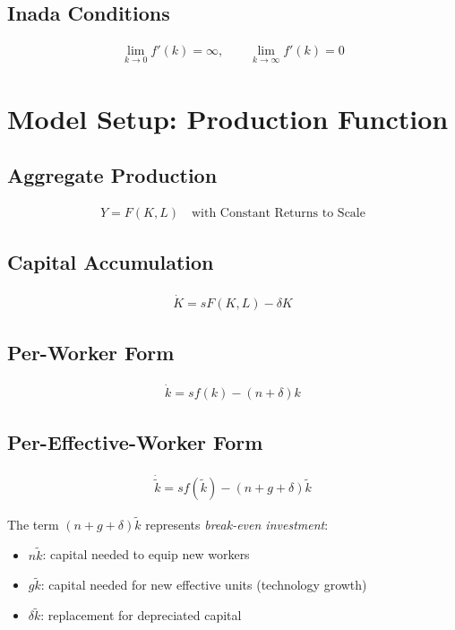 \documentclass[a4paper,11pt]{article}
\newcommand{\ktilde}{\tilde{k}}
\begin{document}
\medskip
\subsection*{Inada Conditions}
\begin{align*}
\lim_{k \to 0} f'(k) = \infty, \qquad \lim_{k \to \infty} f'(k) = 0
\tag{Inada}
\end{align*}

\clearpage

\section{Model Setup: Production Function}

\subsection*{Aggregate Production}
\begin{align*}
Y = F(K, L) \quad \text{with Constant Returns to Scale}
\tag{Production}
\end{align*}

\subsection*{Capital Accumulation}
\begin{align*}
\dot{K} = sF(K, L) - \delta K
\tag{Capital Accumulation}
\end{align*}

\subsection*{Per-Worker Form}
\begin{align*}
\dot{k} = sf(k) - (n + \delta)k
\tag{Per-Worker Dynamics}
\end{align*}

\subsection*{Per-Effective-Worker Form}
\begin{align*}
\dot{\ktilde} = s f(\ktilde) - (n + g + \delta)\ktilde
\tag{Per-Effective Dynamics}
\end{align*}

\medskip
\begin{tcolorbox}[colback=yellow!10,colframe=yellow!60,title=Break-Even Investment]
The term $(n+g+\delta)\ktilde$ represents \textit{break-even investment}:
\begin{itemize}
    \item $n\ktilde$: capital needed to equip new workers
    \item $g\ktilde$: capital needed for new effective units (technology growth)
    \item $\delta\ktilde$: replacement for depreciated capital
\end{itemize}
\end{tcolorbox}
\end{document}
